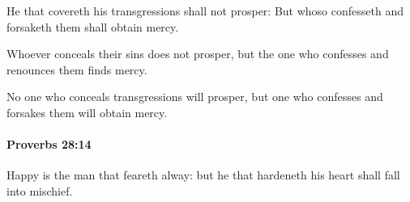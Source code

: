 			\begin{versebox}
					\item[BHS] 
					\item[ASV] He that covereth his transgressions shall not prosper: But whoso confesseth and forsaketh them shall obtain mercy.
					\item[NIV] Whoever conceals their sins does not prosper, but the one who confesses and renounces them finds mercy.
					\item[NRSV] No one who conceals transgressions will prosper, but one who confesses and forsakes them will obtain mercy.
			\end{versebox}

		\paragraph{Proverbs 28:14} %
			\label{PROVERBS-28-14}

			Happy is the man that feareth alway: but he that hardeneth his heart shall fall into mischief.

